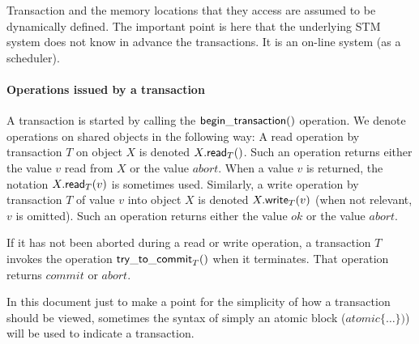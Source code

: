 Transaction and the memory locations that they access
are assumed to be dynamically defined. The important point is here 
that the  underlying STM system does not know in advance the transactions. 
It is an  on-line system (as a scheduler).  



\paragraph{Operations issued by a transaction}
A transaction is started by calling the ${\sf begin\_transaction}()$ operation.
We denote operations on shared objects in the following way:
A read operation by transaction $T$ on object $X$ is denoted
$X.{\sf read}_T()$. Such an operation returns either the value $v$ read from 
$X$ or the value $abort$.  When a value $v$ is returned, 
the notation  $X.{\sf read}_T(v)$ is sometimes used.  
%
Similarly, a write operation by transaction $T$ of value $v$ into object 
$X$ is denoted $X.{\sf write}_T(v)$ (when not relevant, $v$ is omitted). 
Such an operation returns either the value $ok$ or the value $abort$. 
%

If  it  has  not  been  aborted  during a  read  or  write  operation,    a
transaction $T$ invokes  the operation ${\sf try\_to\_commit}_T()$ when 
it terminates. That operation returns $commit$ or $abort$. 

In this document just to make a point for the simplicity of how a transaction should be viewed,
sometimes the syntax of simply an atomic block ($atomic\{ \dots \})$)
will be used to indicate a transaction.



